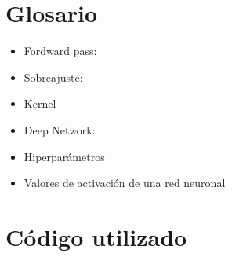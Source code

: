 \documentclass[12,twoside]{TFG-GM}
\theoremstyle{definition}
\theoremstyle{remark}
\begin{document}
\section{Glosario}
\begin{itemize}
\item Fordward pass: 
\item Sobreajuste: 
\item Kernel
\item Deep Network:
\item Hiperparámetros
\item Valores de activación de una red neuronal
\end{itemize}



\section{Código utilizado}
\end{document}
